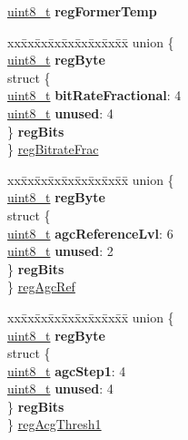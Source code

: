 \begin{DoxyCompactItemize}
\begin{tabbing}
\end{tabbing}\item 
\mbox{\label{structFSK__Register__Map_aa15645edc079deb189e2515563cab9dc}} 
\hyperlink{vl53l0x__types_8h_aba7bc1797add20fe3efdf37ced1182c5}{uint8\+\_\+t} {\bfseries reg\+Former\+Temp}
\item 
\begin{tabbing}
xx\=xx\=xx\=xx\=xx\=xx\=xx\=xx\=xx\=\kill
union \{\\
\>\hyperlink{vl53l0x__types_8h_aba7bc1797add20fe3efdf37ced1182c5}{uint8\_t} {\bfseries regByte}\\
\>struct \{\\
\>\>\hyperlink{vl53l0x__types_8h_aba7bc1797add20fe3efdf37ced1182c5}{uint8\_t} {\bfseries bitRateFractional}: 4\\
\>\>\hyperlink{vl53l0x__types_8h_aba7bc1797add20fe3efdf37ced1182c5}{uint8\_t} {\bfseries unused}: 4\\
\>\} {\bfseries regBits}\\
\} \hyperlink{structFSK__Register__Map_a9fb3c91d923f38a0781d72dc438740fc}{regBitrateFrac}\\

\end{tabbing}\item 
\begin{tabbing}
xx\=xx\=xx\=xx\=xx\=xx\=xx\=xx\=xx\=\kill
union \{\\
\>\hyperlink{vl53l0x__types_8h_aba7bc1797add20fe3efdf37ced1182c5}{uint8\_t} {\bfseries regByte}\\
\>struct \{\\
\>\>\hyperlink{vl53l0x__types_8h_aba7bc1797add20fe3efdf37ced1182c5}{uint8\_t} {\bfseries agcReferenceLvl}: 6\\
\>\>\hyperlink{vl53l0x__types_8h_aba7bc1797add20fe3efdf37ced1182c5}{uint8\_t} {\bfseries unused}: 2\\
\>\} {\bfseries regBits}\\
\} \hyperlink{structFSK__Register__Map_a5a3ed3736aaa460bd9f816dfe47ed750}{regAgcRef}\\

\end{tabbing}\item 
\begin{tabbing}
xx\=xx\=xx\=xx\=xx\=xx\=xx\=xx\=xx\=\kill
union \{\\
\>\hyperlink{vl53l0x__types_8h_aba7bc1797add20fe3efdf37ced1182c5}{uint8\_t} {\bfseries regByte}\\
\>struct \{\\
\>\>\hyperlink{vl53l0x__types_8h_aba7bc1797add20fe3efdf37ced1182c5}{uint8\_t} {\bfseries agcStep1}: 4\\
\>\>\hyperlink{vl53l0x__types_8h_aba7bc1797add20fe3efdf37ced1182c5}{uint8\_t} {\bfseries unused}: 4\\
\>\} {\bfseries regBits}\\
\} \hyperlink{structFSK__Register__Map_a3fc08f679b041e6bd914bb9cfc112aee}{regAcgThresh1}\\


\end{tabbing}
\end{DoxyCompactItemize}
